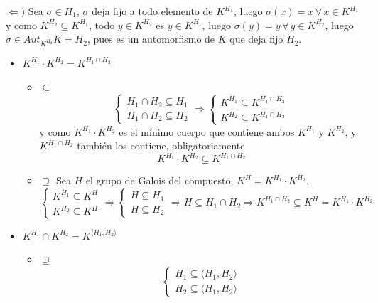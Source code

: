 \begin{enumerate}
\begin{dem}
        $\Leftarrow)$ Sea $\sigma\in H_1$, $\sigma$ deja fijo a todo elemento de $K^{H_1}$, luego $\sigma(x) = x\, \forall\,  x \in K^{H_1}$ y como $K^{H_2} \subseteq K^{H_1}$, todo $y\in K^{H_2}$ es $y\in K^{H_1}$, luego $\sigma(y) = y \,  \forall \, y\in K^{H_2}$, luego $\sigma\in Aut_{K^{H_2}} K = H_2$, pues es un automorfismo de $K$ que deja fijo $H_2$. 
        \begin{itemize}
            \item[a)] $K^{H_{1}} \cdot K^{H_{2}} = K^{H_{1} \cap H_{2}}$
            \begin{itemize}
                \item $\boxed{\subseteq}$ 
                $$\begin{cases}
                    H_1 \cap H_2 \subseteq H_1 \\ H_1 \cap H_2 \subseteq H_2
                \end{cases} \Rightarrow \begin{cases}
                    K^{H_1} \subseteq K^{H_1\cap H_2} \\ K^{H_2} \subseteq K^{H_1\cap H_2}
                \end{cases}$$
                y como $K^{H_1}\cdot K^{H_2}$ es el m\'inimo cuerpo que contiene ambos $K^{H_1}$ y $K^{H_2}$, y $K^{H_1\cap H_2}$ tambi\'en los contiene, obligatoriamente 
                $$K^{H_1}\cdot K^{H_2} \subseteq K^{H_1\cap H_2}$$
                \item $\boxed{\supseteq}$ Sea $H$ el grupo de Galois del compuesto, $K^H = K^{H_1}\cdot K^{H_2}$,
                $$\begin{cases}
                    K^{H_1} \subseteq K^H \\ K^{H_2} \subseteq K^H
                \end{cases} \Rightarrow \begin{cases}
                    H \subseteq H_1 \\ H \subseteq H_2
                \end{cases} \Rightarrow H\subseteq H_1\cap H_2 \Rightarrow K^{H_1\cap H_2} \subseteq K^H = K^{H_1} \cdot K^{H_2}$$
            \end{itemize}
            \item[b)] $K^{H_{1}} \cap K^{H_{2}} = K^{\langle H_{1}, H_{2} \rangle}$
            \begin{itemize}
                \item $\boxed{\supseteq}$ 
                $$\begin{cases}
                    H_1 \subseteq \langle H_{1}, H_{2} \rangle \\ H_2 \subseteq \langle H_{1}, H_{2} \rangle

\end{cases}$$
\end{itemize}
\end{itemize}
\end{dem}
\end{enumerate}
